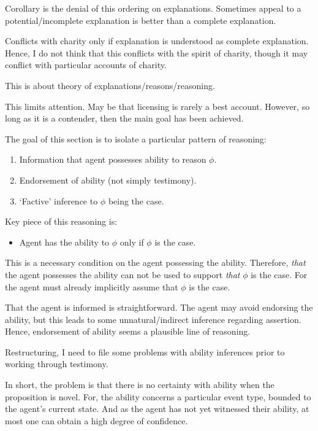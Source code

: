 \documentclass[10pt]{article}
\begin{document}
\begin{note}
{  Corollary is the denial of this ordering on explanations.
  Sometimes appeal to a potential/incomplete explanation is better than a complete explanation.

  Conflicts with charity only if explanation is understood as complete explanation.
  Hence, I do not think that this conflicts with the spirit of charity, though it may conflict with particular accounts of charity.
  }

  This is about theory of explanations/reasons/reasoning.

  This limits attention.
  May be that licensing is rarely a best account.
  However, so long as it is a contender, then the main goal has been achieved.
\end{note}

\begin{note}
  The goal of this section is to isolate a particular pattern of reasoning:
  \begin{enumerate}
  \item Information that agent possesses ability to reason \(\phi\).
  \item Endorsement of ability (not simply testimony).
  \item `Factive' inference to \(\phi\) being the case.
  \end{enumerate}
  Key piece of this reasoning is:
  \begin{itemize}
  \item Agent has the ability to \(\phi\) only if \(\phi\) is the case.
  \end{itemize}
  This is a necessary condition on the agent possessing the ability.
  Therefore, \emph{that} the agent possesses the ability can not be used to support \emph{that} \(\phi\) is the case.
  For the agent must already implicitly assume that \(\phi\) is the case.

  That the agent is informed is straightforward.
  The agent may avoid endorsing the ability, but this leads to some unnatural/indirect inference regarding assertion.
  Hence, endorsement of ability seems a plausible line of reasoning.

  Restructuring, I need to file some problems with ability inferences prior to working through testimony.

  In short, the problem is that there is no certainty with ability when the proposition is novel.
  For, the ability concerns a particular event type, bounded to the agent's current state.
  And as the agent has not yet witnessed their ability, at most one can obtain a high degree of confidence.





\end{note}
\end{document}

